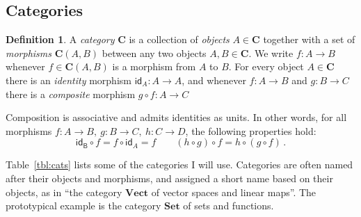 \documentclass[11pt,oneside,draft]{book}
\theoremstyle{definition}
\newtheorem{definition}[theorem]{Definition}
\newcommand{\kw}[1]{\ensuremath{ \mathsf{#1} }}
\begin{document}
\subsection{Categories} %

\begin{definition} %
A \emph{category} $\mathbf{C}$
is a collection of \emph{objects} $A \in \mathbf{C}$
together with a set of \emph{morphisms} $\mathbf{C}(A,B)$
between any two objects $A, B \in \mathbf{C}$.
We write $f : A \rightarrow B$
whenever $f \in \mathbf{C}(A,B)$ is a morphism from $A$ to $B$.
For every object $A \in \mathbf{C}$
there is an \emph{identity} morphism $\kw{id}_A : A \rightarrow A$,
and whenever $f : A \rightarrow B$ and $g : B \rightarrow C$
there is a \emph{composite} morphism $g \circ f : A \rightarrow C$

Composition is associative
and admits identities as units.
In other words,
for all morphisms
$f : A \rightarrow B, \:
 g : B \rightarrow C, \:
 h : C \rightarrow D$,
the following properties hold:
\[
  \kw{id_B} \circ f = f \circ \kw{id}_A = f
  \qquad
  (h \circ g) \circ f = h \circ (g \circ f)
  \,.
\]
\end{definition}

Table~\ref{tbl:cats} lists some of the categories I will use.
Categories are often named after their objects and morphisms,
and assigned a short name based on their objects,
as in ``the category $\mathbf{Vect}$ of vector spaces and linear maps''.
The prototypical example is the category $\mathbf{Set}$
of sets and functions.
\end{document}
